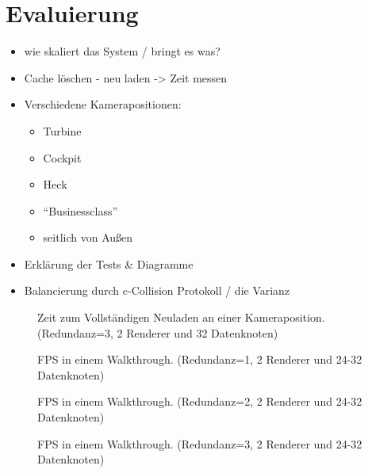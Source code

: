 \chapter{Evaluierung}
\label{chap:eval}
%
\begin{itemize}
 \item wie skaliert das System / bringt es was?
 \item Cache löschen - neu laden -> Zeit messen
 \item Verschiedene Kamerapositionen:
 \begin{itemize}
  \item Turbine
  \item Cockpit
  \item Heck
  \item ``Businessclass''
  \item seitlich von Außen
 \end{itemize}
 \item Erklärung der Tests \& Diagramme
 \item Balancierung durch c-Collision Protokoll / die Varianz
\end{itemize}
%




\begin{figure}
\centering

  \caption{Zeit zum Vollständigen Neuladen an einer Kameraposition. (Redundanz=3, 2 Renderer und 32 Datenknoten)}
  \label{fig:eval:diag1}
\end{figure}

\begin{figure}
\centering

  \caption{FPS in einem Walkthrough. (Redundanz=1, 2 Renderer und 24-32 Datenknoten)}
  \label{fig:eval:diag1}
\end{figure}

\begin{figure}
\centering

  \caption{FPS in einem Walkthrough. (Redundanz=2, 2 Renderer und 24-32 Datenknoten)}
  \label{fig:eval:diag1}
\end{figure}

\begin{figure}
\centering

  \caption{FPS in einem Walkthrough. (Redundanz=3, 2 Renderer und 24-32 Datenknoten)}
  \label{fig:eval:diag1}
\end{figure}

